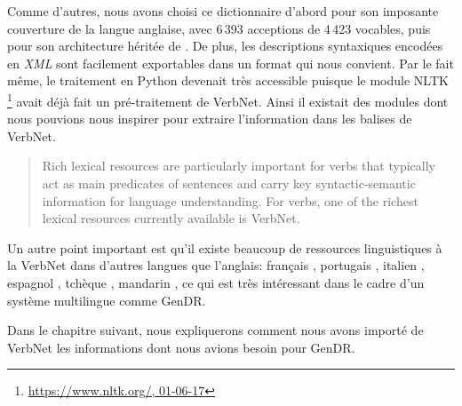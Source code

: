 Comme d'autres, nous avons choisi ce dictionnaire d'abord pour son imposante couverture de la langue anglaise, avec 6\,393 acceptions de 4\,423 vocables, puis pour son architecture héritée de \cite{verb-classes.levin.1993}. De plus, les descriptions syntaxiques encodées en \emph{XML} sont facilement exportables dans un format qui nous convient. Par le fait même, le traitement en Python devenait très accessible puisque le module NLTK \footnote{\url{https://www.nltk.org/, 01-06-17}} avait déjà fait un pré-traitement de VerbNet. Ainsi il existait des modules dont nous pouvions nous inspirer pour extraire l'information dans les balises de VerbNet.

\begin{quote}
Rich lexical resources are particularly important for verbs that typically act as main predicates of sentences and carry key syntactic-semantic information for language understanding. For verbs, one of the richest lexical resources currently available is VerbNet. 
 \end{quote}
 \vspace{-\baselineskip}
 \hfill
 \cite{Majewska2017}

Un autre point important est qu'il existe beaucoup de ressources linguistiques à la VerbNet dans d'autres langues que l'anglais: français \citep{danlos:hal-01179175}, portugais \citep{ScartoncrosslinguisticVerbNetstylelexicon2012}, italien \citep{busso2016italian}, espagnol \citep{TauleAnCoraNetMappingSpanish2010}, tchèque \citep{pala2008can}, mandarin \citep{liu2008construction}, ce qui est très intéressant dans le cadre d'un système multilingue comme GenDR.

Dans le chapitre suivant, nous expliquerons comment nous avons importé de VerbNet les informations dont nous avions besoin pour GenDR.